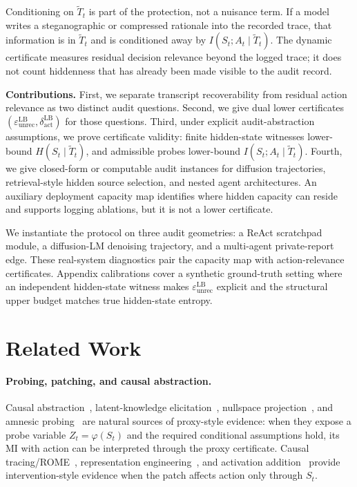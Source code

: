 \documentclass{article}
\begin{document}
  Conditioning on $\tilde T_t$ is part of the protection, not a nuisance term.
  If a model writes a steganographic or compressed rationale into the recorded
  trace, that information is in $\tilde T_t$ and is conditioned away by $I(S_t;
  A_t \mid \tilde T_t)$. The dynamic certificate measures residual decision
  relevance beyond the logged trace; it does not count hiddenness that has
  already been made visible to the audit record.

  \textbf{Contributions.} First, we separate transcript recoverability from
  residual action relevance as two distinct audit questions. Second, we give
  dual lower certificates
  $(\varepsilon_\mathrm{unrec}^\mathrm{LB},
  \delta_\mathrm{act}^\mathrm{LB})$ for those questions. Third, under explicit
  audit-abstraction assumptions, we prove certificate validity: finite
  hidden-state witnesses lower-bound $H(S_t\mid\tilde T_t)$, and admissible
  probes lower-bound $I(S_t;A_t\mid\tilde T_t)$. Fourth, we give closed-form or
  computable audit instances for diffusion trajectories, retrieval-style hidden
  source selection, and nested agent architectures. An auxiliary deployment
  capacity map identifies where hidden capacity can reside and supports logging
  ablations, but it is not a lower certificate.

  We instantiate the protocol on three audit geometries: a ReAct scratchpad
  module, a diffusion-LM denoising trajectory, and a multi-agent private-report
  edge. These real-system diagnostics pair the capacity map with
  action-relevance certificates. Appendix calibrations cover a synthetic
  ground-truth setting where an independent hidden-state witness makes
  $\varepsilon_\mathrm{unrec}^\mathrm{LB}$ explicit and the structural upper
  budget matches true hidden-state entropy.

  \section{Related Work}
  \label{sec:related}

  \paragraph{Probing, patching, and causal abstraction.}
  Causal abstraction~\citep{geiger2021causal}, latent-knowledge
  elicitation~\citep{burns2022discovering}, nullspace
  projection~\citep{ravfogel2020null}, and amnesic
  probing~\citep{elazar2021amnesic} are natural sources of proxy-style evidence:
   when they expose a probe variable $Z_t = \varphi(S_t)$ and the required
  conditional assumptions hold, its MI with action can be interpreted through
  the proxy certificate. Causal tracing/ROME~\citep{meng2022locating},
  representation engineering~\citep{zou2023representation}, and activation
  addition~\citep{turner2023activation} provide intervention-style evidence when
   the patch affects action only through $S_t$.
\end{document}
